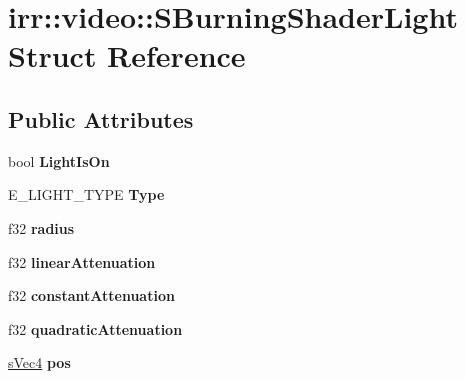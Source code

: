 \hypertarget{structirr_1_1video_1_1_s_burning_shader_light}{\section{irr\-:\-:video\-:\-:S\-Burning\-Shader\-Light Struct Reference}
\label{structirr_1_1video_1_1_s_burning_shader_light}
}
\subsection*{Public Attributes}
\begin{DoxyCompactItemize}
\item 
\hypertarget{structirr_1_1video_1_1_s_burning_shader_light_ab0cbb0400785259611fbdd5b832e4282}{bool {\bfseries Light\-Is\-On}}\label{structirr_1_1video_1_1_s_burning_shader_light_ab0cbb0400785259611fbdd5b832e4282}

\item 
\hypertarget{structirr_1_1video_1_1_s_burning_shader_light_a1508491841271ed9b7a68655ad84ab88}{E\-\_\-\-L\-I\-G\-H\-T\-\_\-\-T\-Y\-P\-E {\bfseries Type}}\label{structirr_1_1video_1_1_s_burning_shader_light_a1508491841271ed9b7a68655ad84ab88}

\item 
\hypertarget{structirr_1_1video_1_1_s_burning_shader_light_a6d757a9034cc764a47ecfc31441b48ae}{f32 {\bfseries radius}}\label{structirr_1_1video_1_1_s_burning_shader_light_a6d757a9034cc764a47ecfc31441b48ae}

\item 
\hypertarget{structirr_1_1video_1_1_s_burning_shader_light_a91ff1ad5dce69233f31c3a2ac4c93aa5}{f32 {\bfseries linear\-Attenuation}}\label{structirr_1_1video_1_1_s_burning_shader_light_a91ff1ad5dce69233f31c3a2ac4c93aa5}

\item 
\hypertarget{structirr_1_1video_1_1_s_burning_shader_light_a63c86c596bea2d2c5379eceea99e0624}{f32 {\bfseries constant\-Attenuation}}\label{structirr_1_1video_1_1_s_burning_shader_light_a63c86c596bea2d2c5379eceea99e0624}

\item 
\hypertarget{structirr_1_1video_1_1_s_burning_shader_light_afc2064ae4ccf2baf4f1a9882164c1d5b}{f32 {\bfseries quadratic\-Attenuation}}\label{structirr_1_1video_1_1_s_burning_shader_light_afc2064ae4ccf2baf4f1a9882164c1d5b}

\item 
\hypertarget{structirr_1_1video_1_1_s_burning_shader_light_a24684e14bf0a4e511d5eca5d791f67b5}{\hyperlink{structirr_1_1video_1_1s_vec4}{s\-Vec4} {\bfseries pos}}\label{structirr_1_1video_1_1_s_burning_shader_light_a24684e14bf0a4e511d5eca5d791f67b5}


\end{DoxyCompactItemize}
